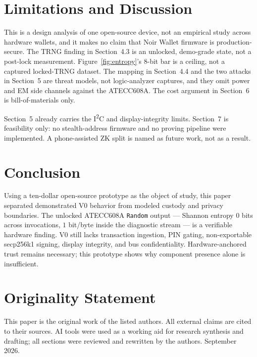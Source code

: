 \documentclass[10pt]{article}
\begin{document}
\section{Limitations and Discussion}

This is a design analysis of one open-source device, not an empirical study across hardware wallets, and it makes no claim that Noir Wallet firmware is production-secure. The TRNG finding in Section~4.3 is an unlocked, demo-grade state, not a post-lock measurement. Figure~\ref{fig:entropy}'s 8-bit bar is a ceiling, not a captured locked-TRNG dataset. The mapping in Section~4.4 and the two attacks in Section~5 are threat models, not logic-analyzer captures, and they omit power and EM side channels against the ATECC608A. The cost argument in Section~6 is bill-of-materials only.

Section~5 already carries the I\textsuperscript{2}C and display-integrity limits. Section~7 is feasibility only: no stealth-address firmware and no proving pipeline were implemented. A phone-assisted ZK split is named as future work, not as a result.

\section{Conclusion}

Using a ten-dollar open-source prototype as the object of study, this paper separated demonstrated V0 behavior from modeled custody and privacy boundaries. The unlocked ATECC608A \texttt{Random} output --- Shannon entropy $0$ bits across invocations, $1$ bit/byte inside the diagnostic stream --- is a verifiable hardware finding. V0 still lacks transaction ingestion, PIN gating, non-exportable secp256k1 signing, display integrity, and bus confidentiality. Hardware-anchored trust remains necessary; this prototype shows why component presence alone is insufficient.

\section*{Originality Statement}
{\small This paper is the original work of the listed authors. All external claims are cited to their sources. AI tools were used as a working aid for research synthesis and drafting; all sections were reviewed and rewritten by the authors. September 2026.}
\end{document}
